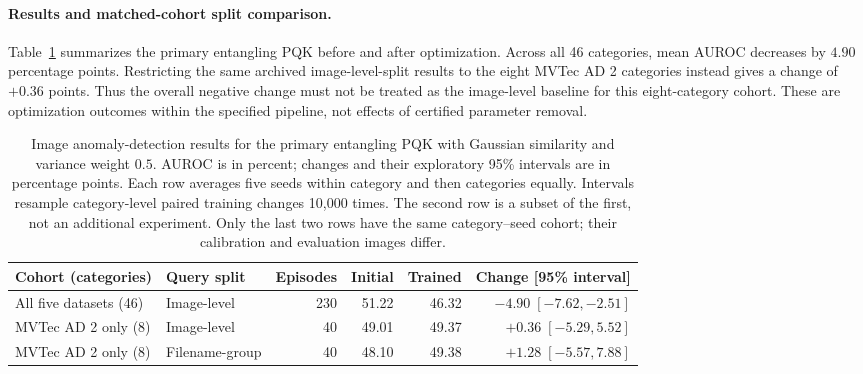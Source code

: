 \paragraph{Results and matched-cohort split comparison.}
Table~\ref{tab:visionprotocol} summarizes the primary entangling PQK
before and after optimization. Across all 46 categories, mean AUROC
decreases by $4.90$ percentage points. Restricting the same archived
image-level-split results to the eight MVTec AD 2 categories instead
gives a change of $+0.36$ points. Thus the overall negative change
must not be treated as the image-level baseline for this eight-category
cohort. These are optimization outcomes within the specified
pipeline, not effects of certified parameter removal.

\begin{table}[tbp]
\centering
\caption{Image anomaly-detection results for the primary entangling
PQK with Gaussian similarity and variance weight $0.5$. AUROC is in
percent; changes and their exploratory 95\% intervals are in
percentage points. Each row averages five seeds within category and
then categories equally. Intervals resample category-level paired
training changes 10,000 times. The second row is a subset of the first,
not an additional experiment. Only the last two rows have the same
category--seed cohort; their calibration and evaluation images differ.}
\label{tab:visionprotocol}
\begin{tabular}{@{}llrrrr@{}}
\toprule
Cohort (categories) & Query split & Episodes & Initial & Trained & Change [95\% interval]\\
\midrule
All five datasets (46) & Image-level & 230 & 51.22 & 46.32 & $-4.90\;[-7.62,-2.51]$\\
MVTec AD 2 only (8) & Image-level & 40 & 49.01 & 49.37 & $+0.36\;[-5.29,5.52]$\\
MVTec AD 2 only (8) & Filename-group & 40 & 48.10 & 49.38 & $+1.28\;[-5.57,7.88]$\\
\bottomrule
\end{tabular}
\end{table}

